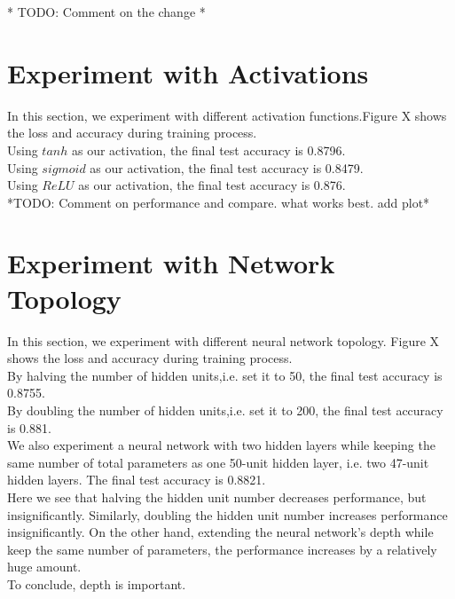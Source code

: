 \documentclass{article} %
\begin{document}
* TODO: Comment on the change *

\section{Experiment with Activations}
In this section, we experiment with different activation functions.Figure X shows the loss and accuracy during training process.\\
Using $tanh$ as our activation, the final test accuracy is 0.8796. \\
Using $sigmoid$ as our activation, the final test accuracy is 0.8479. \\
Using $ReLU$ as our activation, the final test accuracy is 0.876. \\
*TODO: Comment on performance and compare. what works best. add plot*

\section{Experiment with Network Topology}
In this section, we experiment with different neural network topology. Figure X shows the loss and accuracy during training process. \\
By halving the number of hidden units,i.e. set it to 50, the final test accuracy is 0.8755.\\
By doubling the number of hidden units,i.e. set it to 200, the final test accuracy is 0.881.\\
We also experiment a neural network with two hidden layers while keeping the same number of total parameters as one 50-unit hidden layer, i.e. two 47-unit hidden layers. The final test accuracy is 0.8821. \\

Here we see that halving the hidden unit number decreases performance, but insignificantly. Similarly, doubling the hidden unit number increases performance insignificantly. On the other hand, extending the neural network's depth while keep the same number of parameters, the performance increases by a relatively huge amount. \\
To conclude, depth is important.
\end{document}
